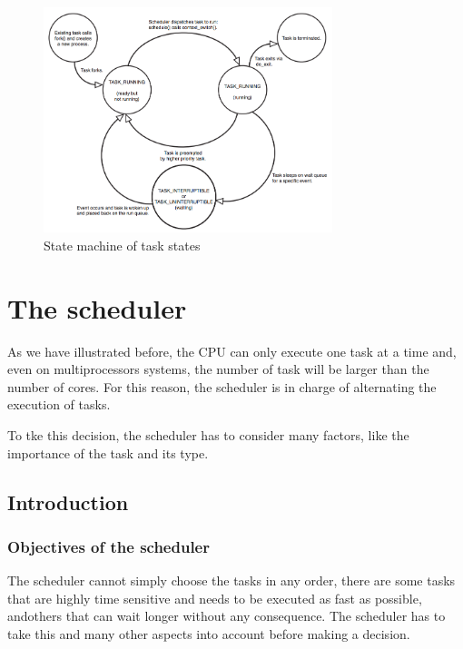 \documentclass[10pt, oneside]{book}
\begin{document}
\begin{figure}[ht]
  \centering
  \includegraphics[width=0.75\textwidth]{process_life} %
  \caption{State machine of task states}
  \label{img:process_life}
\end{figure}

\chapter{The scheduler}
\label{ch:sched}

As we have illustrated before, the CPU can only execute one task at a time and, even on multiprocessors systems, the number of task will be larger than the number of cores. For this reason, the scheduler is in charge of  alternating the execution of tasks.

To tke this decision, the scheduler has to consider many factors, like
the importance of the task and its type.

\section{Introduction}%

\subsection{Objectives of the scheduler}

The scheduler cannot simply choose the tasks in any order, there are some tasks that are highly time sensitive and needs to be executed as fast as possible, andothers that can wait longer without any consequence. The scheduler has to take this and many other aspects into account before making a decision.
\end{document}
